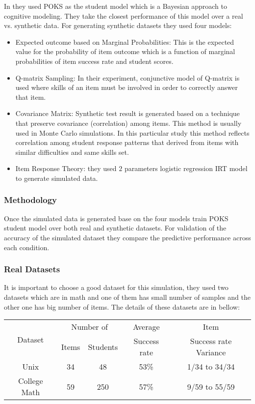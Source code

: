 In \citep{Desmarais2010} they used POKS as the student model which is a Bayesian approach to cognitive modeling. They take the closest performance of this model over a real vs. synthetic data. For generating synthetic datasets they used four models:

\begin{itemize}
\item Expected outcome based on Marginal Probabilities: This is the expected value for the probability of item outcome which is a function of marginal probabilities of item success rate and student scores.
\item Q-matrix Sampling: In their experiment, conjunctive model of Q-matrix is used where skills of an item must be involved in order to correctly answer that item.
\item Covariance Matrix: Synthetic test result is generated based on a technique that preserve covariance (correlation) among items. This method is usually used in Monte Carlo simulations. In this particular study this method reflects correlation among student response patterns that derived from items with similar difficulties and same skills set.
\item Item Response Theory: they used $2$ parameters logistic regression IRT model to generate simulated data.

\end{itemize}

\subsubsection{Methodology}
Once the simulated data is generated base on the four models \citet{Desmarais2010} train POKS student model over both real and synthetic datasets. For validation of the accuracy of the simulated dataset they compare the predictive performance across each condition. 

\subsubsection{Real Datasets}
It is important to choose a good dataset for this simulation, they used two datasets which are in math and one of them has small number of samples and the other one has big number of items. The details of these datasets are in bellow:

\begin{center}

\begin{tabular}{|c|c|c|c|c|}
\hline 
\multirow{2}{*}{Dataset} & \multicolumn{2}{c|}{Number of} & Average & Item\tabularnewline
\cline{2-3} 
 & Items & Students & Success rate & Success rate Variance\tabularnewline
\hline 
Unix & 34 & 48 & 53\% & 1/34 to 34/34\tabularnewline
\hline 
College Math & 59 & 250 & 57\% & 9/59 to 55/59\tabularnewline
\hline 
\end{tabular}

\end{center}

